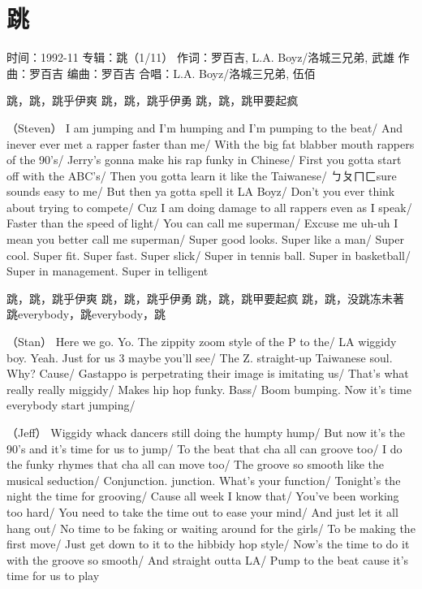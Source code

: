\documentclass[UTF8,a4paper,oneside,twocolumn,12pt]{ctexbook}
\newcommand{\infopair}[2]{\textbullet #1：#2}
\newcommand{\zc}[1][伍佰]{\infopair{作词}{#1}}
\newcommand{\zq}[1][伍佰]{\infopair{作曲}{#1}}
\newcommand{\bq}[1][伍佰]{\infopair{编曲}{#1}}
\newcommand{\zj}[1]{\infopair{专辑}{#1}}
\newcommand{\yc}[1]{\infopair{原唱}{#1}}
\newcommand{\sj}[1]{\infopair{时间}{#1}}
\newenvironment{info}{\begin{flushleft}\kaishu
	}
	{\end{flushleft}\normalsize\yahei\par}
\newenvironment{lyric}{
	}
{}
\begin{document}
\section{跳}
\begin{info}%
	\sj{1992-11}%
	\zj{跳（1/11）}
	\zc[罗百吉, L.A. Boyz/洛城三兄弟, 武雄]
	\zq[罗百吉]
	\bq[罗百吉]
	\infopair{合唱}{L.A. Boyz/洛城三兄弟, 伍佰}
\end{info}
\begin{lyric}
	跳，跳，跳乎伊爽
	跳，跳，跳乎伊勇
	跳，跳，跳甲要起疯

	（Steven）
	I am jumping and I'm humping and I'm pumping to the beat/
	And inever ever met a rapper faster than me/
	With the big fat blabber mouth rappers of the 90's/
	Jerry's gonna make his rap funky in Chinese/
	First you gotta start off with the ABC's/
	Then you gotta learn it like the Taiwanese/
	ㄅㄆㄇㄈsure sounds easy to me/
	But then ya gotta spell it LA Boyz/
	Don't you ever think about trying to compete/
	Cuz I am doing damage to all rappers even as I speak/
	Faster than the speed of light/
	You can call me superman/
	Excuse me uh-uh I mean you better call me superman/
	Super good looks. Super like a man/
	Super cool. Super fit. Super fast. Super slick/
	Super in tennis ball. Super in basketball/
	Super in management. Super in telligent

	跳，跳，跳乎伊爽
	跳，跳，跳乎伊勇
	跳，跳，跳甲要起疯
	跳，跳，没跳冻未著
	跳everybody，跳everybody，跳

	（Stan）
	Here we go. Yo. The zippity zoom style of the P to the/
	LA wiggidy boy. Yeah. Just for us 3 maybe you'll see/
	The Z. straight-up Taiwanese soul. Why? Cause/
	Gastappo is perpetrating their image is imitating us/
	That's what really really miggidy/
	Makes hip hop funky. Bass/
	Boom bumping. Now it's time everybody start jumping/

	（Jeff）
	Wiggidy whack dancers still doing the humpty hump/
	But now it's the 90's and it's time for us to jump/
	To the beat that cha all can groove too/
	I do the funky rhymes that cha all can move too/
	The groove so smooth like the musical seduction/
	Conjunction. junction. What's your function/
	Tonight's the night the time for grooving/
	Cause all week I know that/
	You've been working too hard/
	You need to take the time out to ease your mind/
	And just let it all hang out/
	No time to be faking or waiting around for the girls/
	To be making the first move/
	Just get down to it to the hibbidy hop style/
	Now's the time to do it with the groove so smooth/
	And straight outta LA/
	Pump to the beat cause it's time for us to play
\end{lyric}
\end{document}
